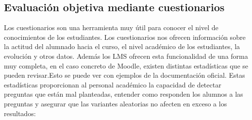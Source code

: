 \subsection{Evaluación objetiva mediante cuestionarios} 
Los cuestionarios son una herramienta muy útil para conocer el nivel de conocimientos de los estudiantes. Los cuestionarios nos ofrecen información sobre la actitud del alumnado hacia el curso, el nivel académico de los estudiantes, la evolución y otros datos. Además los LMS ofrecen esta funcionalidad de una forma muy completa, en el caso concreto de Moodle, existen distintas estadísticas que se pueden revisar.Esto se puede ver con ejemplos de la documentación oficial\cite{estadisticas-examen}. Estas estadísticas proporcionan al personal académico la capacidad de detectar preguntas que están mal planteadas, entender como responden los alumnos a las preguntas y asegurar que las variantes aleatorias no afecten en exceso a los resultados:

